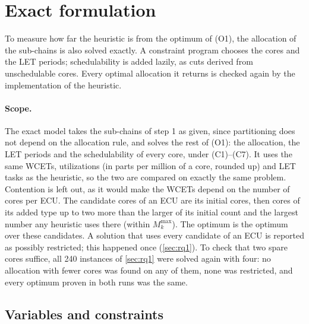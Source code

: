\section{Exact formulation}
\label{sec:exact}

\begin{inbrief}
To measure how far the heuristic is from the optimum of (O1), the
allocation of the sub-chains is also solved exactly. A constraint program
chooses the cores and the LET periods; schedulability is added lazily, as
cuts derived from unschedulable cores. Every optimal allocation it returns
is checked again by the implementation of the heuristic.
\end{inbrief}

\paragraph{Scope.} The exact model takes the sub-chains of step 1 as
given, since partitioning does not depend on the allocation rule, and
solves the rest of (O1): the allocation, the LET periods and the
schedulability of every core, under (C1)--(C7). It uses the same WCETs,
utilizations (in parts per million of a core, rounded up) and LET tasks
as the heuristic, so the two are compared on exactly the same problem.
Contention is left out, as it would make the WCETs depend on the number of
cores per ECU. The candidate cores of an ECU are its initial cores, then
cores of its added type up to two more than the larger of its initial
count and the largest number any heuristic uses there (within
$M^{\max}_k$). The optimum is the optimum over these candidates. A
solution that uses every candidate of an ECU is reported as possibly
restricted; this happened once (\cref{sec:rq1}). To check that two spare
cores suffice, all 240 instances of \cref{sec:rq1} were solved again with
four: no allocation with fewer cores was found on any of them, none was
restricted, and every optimum proven in both runs was the same.

\subsection{Variables and constraints}

